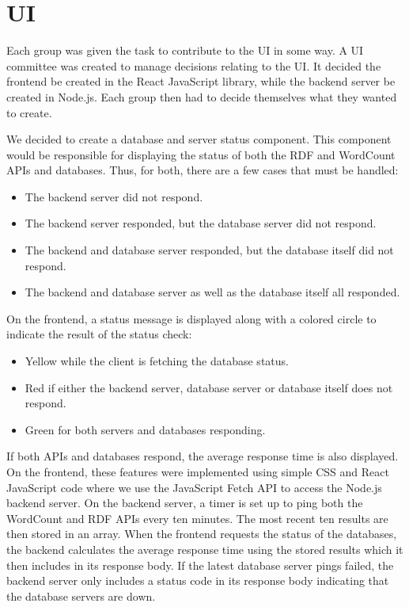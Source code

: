 \section{UI}\label{UI}
Each group was given the task to contribute to the \knox{} UI in some way. 
A UI committee was created to manage decisions relating to the UI. 
It decided the frontend be created in the React JavaScript library\cite{Reactjs}, while the backend server be created in Node.js\cite{Nodejs}.
Each group then had to decide themselves what they wanted to create. 


We decided to create a database and server status component. 
This component would be responsible for displaying the status of both the RDF and WordCount APIs and databases. 
Thus, for both, there are a few cases that must be handled:
\begin{itemize}
	\item The backend server did not respond.
	\item The backend server responded, but the database server did not respond.
	\item The backend and database server responded, but the database itself did not respond.
	\item The backend and database server as well as the database itself all responded.
\end{itemize}

On the frontend, a status message is displayed along with a colored circle to indicate the result of the status check:
\begin{itemize}
	\item Yellow while the client is fetching the database status.
	\item Red if either the backend server, database server or database itself does not respond.
	\item Green for both servers and databases responding.
\end{itemize}
If both APIs and databases respond, the average response time is also displayed.
On the frontend, these features were implemented using simple CSS and React JavaScript code where we use the JavaScript Fetch API to access the Node.js backend server.
On the backend server, a timer is set up to ping both the WordCount and RDF APIs every ten minutes.
The most recent ten results are then stored in an array.
When the frontend requests the status of the databases, the backend calculates the average response time using the stored results which it then includes in its response body.
If the latest database server pings failed, the backend server only includes a status code in its response body indicating that the database servers are down.


